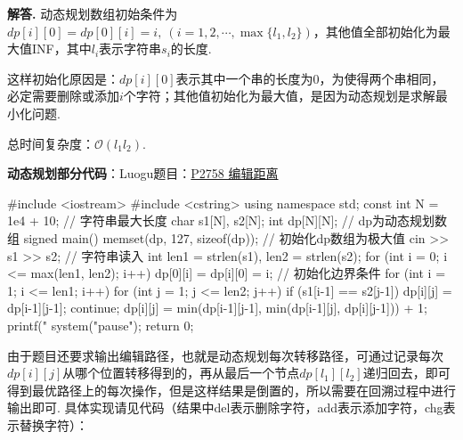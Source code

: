 \documentclass[12pt, a4paper, oneside]{ctexart}
\numberwithin{equation}{section}  %
\newcounter{problem}  %
\newenvironment{solution}[1][]{\par\noindent\textbf{#1解答. }}{\smallskip\par}  %
\def\O{\mathcal{O}}         %
\begin{document}
\begin{solution}
    动态规划数组初始条件为$dp[i][0] = dp[0][i] = i,\ (i = 1,2,\cdots, \max\{l_1,l_2\})$，其他值全部初始化为最大值INF，其中$l_i$表示字符串$s_i$的长度.
    
    这样初始化原因是：$dp[i][0]$表示其中一个串的长度为$0$，为使得两个串相同，必定需要删除或添加$i$个字符；其他值初始化为最大值，是因为动态规划是求解最小化问题.

    总时间复杂度：$\O(l_1l_2)$.

    \textbf{动态规划部分代码}：Luogu题目：\href{https://www.luogu.com.cn/problem/P2758}{P2758 编辑距离}
    \begin{cppcode}
#include <iostream>
#include <cstring>
using namespace std;
const int N = 1e4 + 10;  // 字符串最大长度
char s1[N], s2[N];
int dp[N][N];  // dp为动态规划数组
signed main() {
    memset(dp, 127, sizeof(dp));  // 初始化dp数组为极大值
    cin >> s1 >> s2;  // 字符串读入
    int len1 = strlen(s1), len2 = strlen(s2);
    for (int i = 0; i <= max(len1, len2); i++) dp[0][i] = dp[i][0] = i;  // 初始化边界条件
    for (int i = 1; i <= len1; i++) {
        for (int j = 1; j <= len2; j++) {
            if (s1[i-1] == s2[j-1]) {
                dp[i][j] = dp[i-1][j-1];
                continue;
            }
            dp[i][j] = min(dp[i-1][j-1], min(dp[i-1][j], dp[i][j-1])) + 1;
        }
    }
    printf("%
    system("pause");
    return 0;
}
    \end{cppcode}

    由于题目还要求输出编辑路径，也就是动态规划每次转移路径，可通过记录每次$dp[i][j]$从哪个位置转移得到的，再从最后一个节点$dp[l_1][l_2]$递归回去，即可得到最优路径上的每次操作，但是这样结果是倒置的，所以需要在回溯过程中进行输出即可. 具体实现请见代码（结果中del表示删除字符，add表示添加字符，chg表示替换字符）：


\end{solution}
\end{document}
